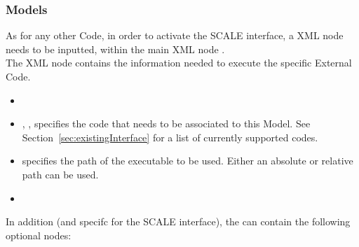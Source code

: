 
\subsubsection{Models}
As for any other Code, in order to activate the SCALE interface, a   XML node needs to be inputted, within the
main XML node .
\\The  {} XML node contains the
information needed to execute the specific External Code.

\attrsIntro
%
\vspace{-5mm}
\begin{itemize}
  \itemsep0em
  \item \nameDescription
  \item {}, , specifies the
  code that needs to be associated to this Model.
  \nb See Section~\ref{sec:existingInterface} for a list of currently supported
  codes.
\end{itemize}
\vspace{-5mm}

\subnodesIntro
%
\begin{itemize}
  \item {}  specifies the path
  of the executable to be used.
  \nb Either an absolute or relative path can be used.
  \item {}
\end{itemize}

In addition (and specifc for the SCALE interface), the   can contain the following optional nodes:

